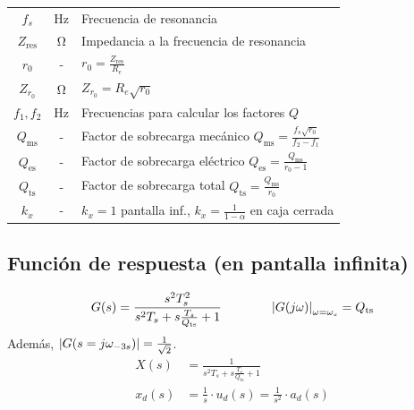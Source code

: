 \documentclass[a4paper, 8pt]{extarticle}
\begin{document}
\begin{multicols}{3}
\begin{center}
\begin{tabular}{|c|c|l|}
            \hline
            $f _s$             & \unit{\hertz}           & Frecuencia de resonancia                                                                                                                                      \\
            $Z _{\text{res}} $ & \unit{\ohm}             & Impedancia a la frecuencia de resonancia                                                                                                                      \\
            $r_0$              & -                       & $r_0 =\frac{Z _{\text{res}}}{R_e}$                                                                                                                            \\
            $Z_{r_0}$          & \unit{\ohm}             & $Z_{r_0}=R_e \sqrt{r_0}$                                                                                                                                      \\
            $f_1, f_2$         & \unit{\hertz}           & Frecuencias para calcular los factores $Q$                                                                                                                    \\
            $Q _{\text{ms}}$   & -                       & Factor de sobrecarga mecánico $Q _{\text{ms}} = \frac{f _s \sqrt{r_0}}{f_2 - f_1}$                                                                            \\
            $Q _{\text{es}}$   & -                       & Factor de sobrecarga eléctrico $Q _{\text{es}} = \frac{Q _{\text{ms}}}{r_0 - 1}$                                                                              \\
            $Q _{\text{ts}}$   & -                       & Factor de sobrecarga total $Q _{\text{ts}} = \frac{Q _{\text{ms}}}{r_0}$                                                                                      \\
            $k_x$              & -                       & $k_x = 1$ pantalla inf., $k_x = \frac{1}{1-\alpha}$ en caja cerrada                                                                                           \\
            \hline
        \end{tabular}
    \end{center}
    \subsection{Función de respuesta (en pantalla infinita)}
    \[ G(s) = \frac{s^2T_s^2}{s^2 T_s + s \frac{T_s}{Q _{\text{ts}} } + 1} \qquad\qquad \abs{G(j \omega )}_{\omega = \omega _s} = Q _{\text{ts}}\]
    Además, $\abs{G(s=j\omega_{-3s})} = \frac{1}{\sqrt{2}}$.
    \begin{align*}
        X(s)    & = \frac{1}{s^2 T_s + s \frac{T_s}{Q _{\text{ts}}} + 1}    \\
        x_d (s) & = \frac{1}{s} \cdot u_d (s) = \frac{1}{s^2} \cdot a_d (s)
    \end{align*}

\end{multicols}
\end{document}
